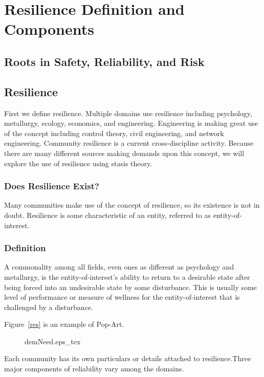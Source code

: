 
\renewcommand{\thechapter}{2}

\chapter{Resilience Definition and Components}

\section{Roots in Safety, Reliability, and Risk}

\section{Resilience}
First we define resilience. Multiple domains use resilience including
psychology, metallurgy, ecology, economics, and
engineering. Engineering is making great use of the concept including
control theory, civil engineering, and network engineering. Community
resilience is a current cross-discipline activity. Because there are
many different sources making demands upon this concept, we will
explore the use of resilience using stasis theory.

\subsection{Does Resilience Exist?}

Many communities make use of the concept of resilience, so its
existence is not in doubt. Resilience is some characteristic of an
entity, referred to as entity-of-interest. 

\subsection{Definition}

A commonality among all fields, even ones as different as
psychology and metallurgy, is the entity-of-interest's ability to
return to a desirable state after being forced into an undesirable
state by some disturbance. This is usually some level of performance
or measure of wellness for the entity-of-interest that is challenged
by a disturbance.

Figure~\ref{res} is an example of Pop-Art.
\begin{figure}
  \centering
  \def\svgwidth{70mm}
  {demNeed.eps_tex}
\end{figure}
Each community has its own particulars or details attached to
resilience.Three major components of reliability vary among the domains. 

